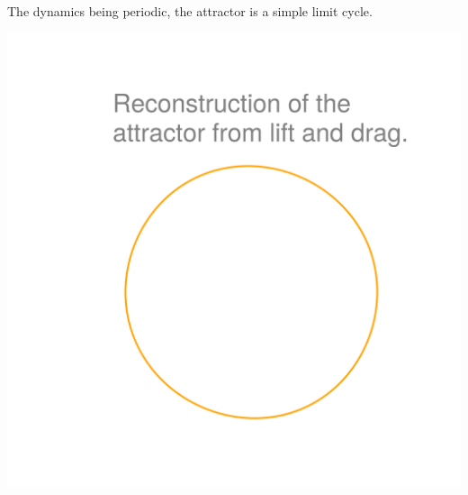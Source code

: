 \documentclass[aspectratio=169, usenames, dvipsnames]{beamer}
\begin{document}
\begin{frame}
  \vfill
  \begin{minipage}{.48\textwidth}
    The dynamics being periodic, the attractor is a simple limit cycle.
  \end{minipage}%
  \hfill
  \begin{minipage}{.48\textwidth}
    \centering
    \includegraphics[width=\textwidth]{cylinder_attractor_reconstruction}
  \end{minipage}
  \vfill
\end{frame}
\end{document}
